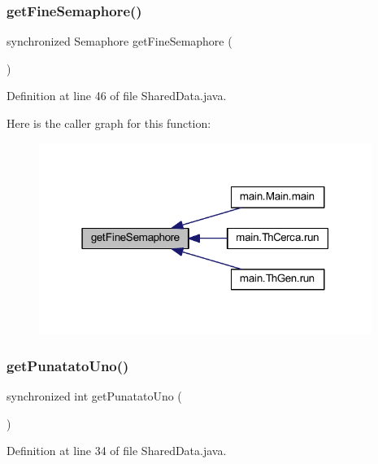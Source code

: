 \subsubsection{\texorpdfstring{get\+Fine\+Semaphore()}{getFineSemaphore()}}
{\footnotesize\ttfamily synchronized Semaphore get\+Fine\+Semaphore (\begin{DoxyParamCaption}{ }\end{DoxyParamCaption})}



Definition at line 46 of file Shared\+Data.\+java.

Here is the caller graph for this function\+:
\nopagebreak
\begin{figure}[H]
\begin{center}
\leavevmode
\includegraphics[width=307pt]{classmain_1_1_shared_data_ab9a75de14be42bfeb3654d44f09b20bf_icgraph}
\end{center}
\end{figure}
\mbox{\label{classmain_1_1_shared_data_a61e4168cef037c5305a703af0c3e5ce5}} 
\subsubsection{\texorpdfstring{get\+Punatato\+Uno()}{getPunatatoUno()}}
{\footnotesize\ttfamily synchronized int get\+Punatato\+Uno (\begin{DoxyParamCaption}{ }\end{DoxyParamCaption})}



Definition at line 34 of file Shared\+Data.\+java.

